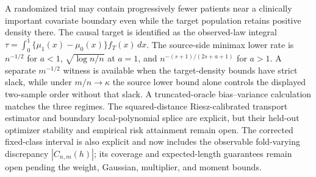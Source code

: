 A randomized trial may contain progressively fewer patients near a clinically important covariate boundary even while the target population retains positive density there. The causal target is identified as the observed-law integral \(\tau=\int_0^1\{\mu_1(x)-\mu_0(x)\}f_T(x)\,dx\). The source-side minimax lower rate is \(n^{-1/2}\) for \(a<1\), \(\sqrt{\log n/n}\) at \(a=1\), and \(n^{-(s+1)/(2s+a+1)}\) for \(a>1\). A separate \(m^{-1/2}\) witness is available when the target-density bounds have strict slack, while under \(m/n\to\kappa\) the source lower bound alone controls the displayed two-sample order without that slack. A truncated-oracle bias--variance calculation matches the three regimes. The squared-distance Riesz-calibrated transport estimator and boundary local-polynomial splice are explicit, but their held-out optimizer stability and empirical risk attainment remain open. The corrected fixed-class interval is also explicit and now includes the observable fold-varying discrepancy \(|C_{n,m}(h)|\); its coverage and expected-length guarantees remain open pending the weight, Gaussian, multiplier, and moment bounds.
